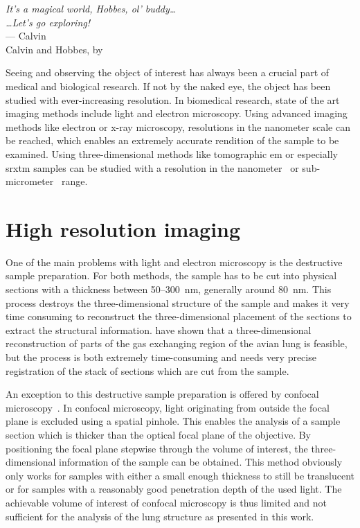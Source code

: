 \acresetall
{}\label{ch:introduction}
\begin{flushright}{\slshape
		It's a magical world, Hobbes, ol' buddy\ldots\\
		\ldots Let's go exploring!}\\ \medskip
		--- Calvin\\Calvin and Hobbes, by \citep{Watterson1996}
\end{flushright}
\vspace{6cm}

Seeing and observing the object of interest has always been a crucial part of medical and biological research. If not by the naked eye, the object has been studied with ever-increasing resolution. In biomedical research, state of the art imaging methods include light and electron microscopy. Using advanced imaging methods like electron or x-ray microscopy, resolutions in the nanometer scale can be reached, which enables an extremely accurate rendition of the sample to be examined. Using three-dimensional methods like tomographic \ac{em} or especially \ac{srxtm} samples can be studied with a resolution in the nanometer~\cite{Downing2007} or sub-micrometer~\cite{Stampanoni2010} range.

\section{High resolution imaging}
One of the main problems with light and electron microscopy is the destructive sample preparation. For both methods, the sample has to be cut into physical sections with a thickness between 50--\SI{300}{\nano\meter}, generally around \SI{80}{\nano\meter}. This process destroys the three-dimensional structure of the sample and makes it very time consuming to reconstruct the three-dimensional placement of the sections to extract the structural information. \citet{Woodward2005} have shown that a three-dimensional reconstruction of parts of the gas exchanging region of the avian lung is feasible, but the process is both extremely time-consuming and needs very precise registration of the stack of sections which are cut from the sample.

An exception to this destructive sample preparation is offered by confocal microscopy~\cite{Minsky1961}. In confocal microscopy, light originating from outside the focal plane is excluded using a spatial pinhole. This enables the analysis of a sample section which is thicker than the optical focal plane of the objective. By positioning the focal plane stepwise through the volume of interest, the three-dimensional information of the sample can be obtained. This method obviously only works for samples with either a small enough thickness to still be translucent or for samples with a reasonably good penetration depth of the used light. The achievable volume of interest of confocal microscopy is thus limited and not sufficient for the analysis of the lung structure as presented in this work. 

